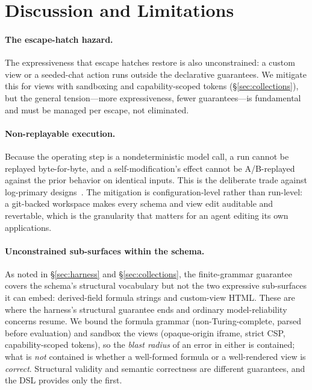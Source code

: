 \documentclass[11pt]{article}
\begin{document}
\section{Discussion and Limitations}
\label{sec:limitations}

\paragraph{The escape-hatch hazard.}
The expressiveness that escape hatches restore is also unconstrained: a custom
view or a seeded-chat action runs outside the declarative guarantees. We mitigate
this for views with sandboxing and capability-scoped tokens (\S\ref{sec:collections}),
but the general tension---more expressiveness, fewer guarantees---is fundamental
and must be managed per escape, not eliminated.

\paragraph{Non-replayable execution.}
Because the operating step is a nondeterministic model call, a run cannot be
replayed byte-for-byte, and a self-modification's effect cannot be A/B-replayed
against the prior behavior on identical inputs. This is the deliberate trade
against log-primary designs~\citep{ynakajima2026log}. The mitigation is
configuration-level rather than run-level: a git-backed workspace makes every
schema and view edit auditable and revertable, which is the granularity that
matters for an agent editing its own applications.

\paragraph{Unconstrained sub-surfaces within the schema.}
As noted in \S\ref{sec:harness} and \S\ref{sec:collections}, the finite-grammar
guarantee covers the schema's structural vocabulary but not the two expressive
sub-surfaces it can embed: derived-field formula strings and custom-view HTML.
These are where the harness's structural guarantee ends and ordinary
model-reliability concerns resume. We bound the formula grammar (non-Turing-complete,
parsed before evaluation) and sandbox the views (opaque-origin iframe, strict CSP,
capability-scoped tokens), so the \emph{blast radius} of an error in either is
contained; what is \emph{not} contained is whether a well-formed formula or a
well-rendered view is \emph{correct}. Structural validity and semantic correctness
are different guarantees, and the DSL provides only the first.
\end{document}
